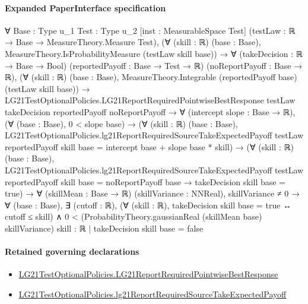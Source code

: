 \documentclass[10pt]{article}
\begin{document}
\paragraph{Expanded PaperInterface specification}
\begin{ReviewVerbatim}
∀ {Base : Type u_1} {Test : Type u_2} [inst : MeasurableSpace Test] (testLaw : ℝ → Base → MeasureTheory.Measure Test),
  (∀ (skill : ℝ) (base : Base), MeasureTheory.IsProbabilityMeasure (testLaw skill base)) →
    ∀ (takeDecision : ℝ → Base → Bool) (reportedPayoff : Base → Test → ℝ) (noReportPayoff : Base → ℝ),
      (∀ (skill : ℝ) (base : Base), MeasureTheory.Integrable (reportedPayoff base) (testLaw skill base)) →
        LG21TestOptionalPolicies.LG21ReportRequiredPointwiseBestResponse testLaw takeDecision reportedPayoff
            noReportPayoff →
          ∀ (intercept slope : Base → ℝ),
            (∀ (base : Base), 0 < slope base) →
              (∀ (skill : ℝ) (base : Base),
                  LG21TestOptionalPolicies.lg21ReportRequiredSourceTakeExpectedPayoff testLaw reportedPayoff skill
                      base =
                    intercept base + slope base * skill) →
                (∀ (skill : ℝ) (base : Base),
                    LG21TestOptionalPolicies.lg21ReportRequiredSourceTakeExpectedPayoff testLaw reportedPayoff skill
                          base =
                        noReportPayoff base →
                      takeDecision skill base = true) →
                  ∀ (skillMean : Base → ℝ) (skillVariance : NNReal),
                    skillVariance ≠ 0 →
                      ∀ (base : Base),
                        ∃ (cutoff : ℝ),
                          (∀ (skill : ℝ), takeDecision skill base = true ↔ cutoff ≤ skill) ∧
                            0 <
                              (ProbabilityTheory.gaussianReal (skillMean base) skillVariance)
                                {skill : ℝ | takeDecision skill base = false}
\end{ReviewVerbatim}

\paragraph{Retained governing declarations}
\begin{itemize}\raggedright
\item \hyperlink{governing-declaration-3654fc437712fb93}{LG21\allowbreak{}Test\allowbreak{}Optional\allowbreak{}Policies.\allowbreak{}LG21\allowbreak{}Report\allowbreak{}Required\allowbreak{}Pointwise\allowbreak{}Best\allowbreak{}Response}
\item \hyperlink{governing-declaration-b92ba410587034ec}{LG21\allowbreak{}Test\allowbreak{}Optional\allowbreak{}Policies.\allowbreak{}lg21\allowbreak{}Report\allowbreak{}Required\allowbreak{}Source\allowbreak{}Take\allowbreak{}Expected\allowbreak{}Payoff}
\end{itemize}
\end{document}
